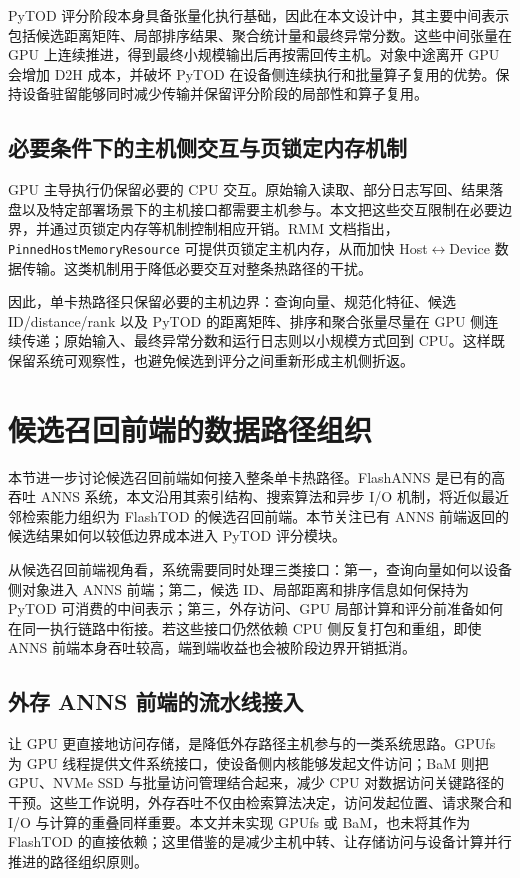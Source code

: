 PyTOD 评分阶段本身具备张量化执行基础，因此在本文设计中，其主要中间表示包括候选距离矩阵、局部排序结果、聚合统计量和最终异常分数。这些中间张量在 GPU 上连续推进，得到最终小规模输出后再按需回传主机。对象中途离开 GPU 会增加 D2H 成本，并破坏 PyTOD 在设备侧连续执行和批量算子复用的优势。保持设备驻留能够同时减少传输并保留评分阶段的局部性和算子复用。

\subsection{必要条件下的主机侧交互与页锁定内存机制}

GPU 主导执行仍保留必要的 CPU 交互。原始输入读取、部分日志写回、结果落盘以及特定部署场景下的主机接口都需要主机参与。本文把这些交互限制在必要边界，并通过页锁定内存等机制控制相应开销。RMM 文档指出，\texttt{PinnedHostMemoryResource} 可提供页锁定主机内存，从而加快 Host$\leftrightarrow$Device 数据传输\citep{rapids_rmm_pinned}。这类机制用于降低必要交互对整条热路径的干扰。

因此，单卡热路径只保留必要的主机边界：查询向量、规范化特征、候选 ID/distance/rank 以及 PyTOD 的距离矩阵、排序和聚合张量尽量在 GPU 侧连续传递；原始输入、最终异常分数和运行日志则以小规模方式回到 CPU。这样既保留系统可观察性，也避免候选到评分之间重新形成主机侧折返。

\section{候选召回前端的数据路径组织}

本节进一步讨论候选召回前端如何接入整条单卡热路径。FlashANNS 是已有的高吞吐 ANNS 系统，本文沿用其索引结构、搜索算法和异步 I/O 机制，将近似最近邻检索能力组织为 FlashTOD 的候选召回前端。本节关注已有 ANNS 前端返回的候选结果如何以较低边界成本进入 PyTOD 评分模块。

从候选召回前端视角看，系统需要同时处理三类接口：第一，查询向量如何以设备侧对象进入 ANNS 前端；第二，候选 ID、局部距离和排序信息如何保持为 PyTOD 可消费的中间表示；第三，外存访问、GPU 局部计算和评分前准备如何在同一执行链路中衔接。若这些接口仍然依赖 CPU 侧反复打包和重组，即使 ANNS 前端本身吞吐较高，端到端收益也会被阶段边界开销抵消。

\subsection{外存 ANNS 前端的流水线接入}

让 GPU 更直接地访问存储，是降低外存路径主机参与的一类系统思路。GPUfs 为 GPU 线程提供文件系统接口，使设备侧内核能够发起文件访问\citep{silberstein2013gpufs}；BaM 则把 GPU、NVMe SSD 与批量访问管理结合起来，减少 CPU 对数据访问关键路径的干预\citep{qureshi2023bam}。这些工作说明，外存吞吐不仅由检索算法决定，访问发起位置、请求聚合和 I/O 与计算的重叠同样重要。本文并未实现 GPUfs 或 BaM，也未将其作为 FlashTOD 的直接依赖；这里借鉴的是减少主机中转、让存储访问与设备计算并行推进的路径组织原则。

